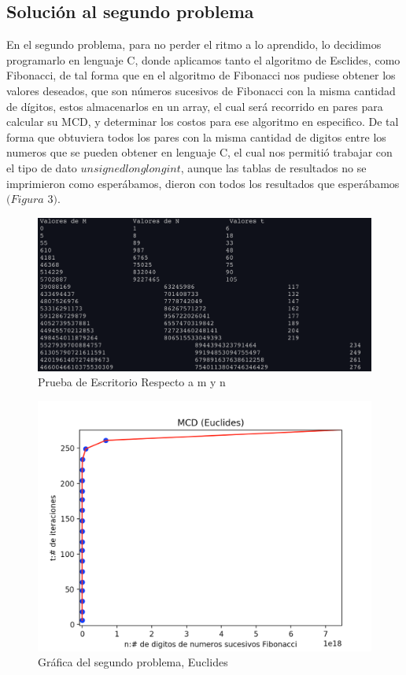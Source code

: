 \documentclass[12pt,twoside]{article}
\begin{document}
\subsection{\textbf{Soluci\'on al segundo problema}}
En el segundo problema, para no perder el ritmo a lo aprendido, lo decidimos programarlo en lenguaje C, donde aplicamos tanto el
algoritmo de Esclides, como Fibonacci, de tal forma que en el algoritmo de Fibonacci nos pudiese obtener los valores deseados,
que son n\'umeros sucesivos de Fibonacci con la misma cantidad de d\'igitos, estos almacenarlos en un array, el cual ser\'a
recorrido en pares para calcular su MCD, y determinar los costos para ese algoritmo en especifico.
De tal forma que obtuviera todos los pares con la misma cantidad de digitos entre los numeros que se pueden obtener en lenguaje C,
el cual nos permiti\'o trabajar con el tipo de dato $unsigned long long int$, aunque las tablas de resultados no se imprimieron como
esper\'abamos, dieron con todos los resultados que esper\'abamos $(Figura$ $3)$.

\begin{figure}
  \centering
    \includegraphics[height=0.5\textwidth]{Figure3}
  \caption{Prueba de Escritorio Respecto a m y n}
  \label{fig:ejemplo3}
\end{figure}

\begin{figure}
  \centering
    \includegraphics[height=0.5\textwidth]{Figure4}
  \caption{Gr\'afica del segundo problema, Euclides}
  \label{fig:ejemplo4}
\end{figure}
\newpage
\end{document}
